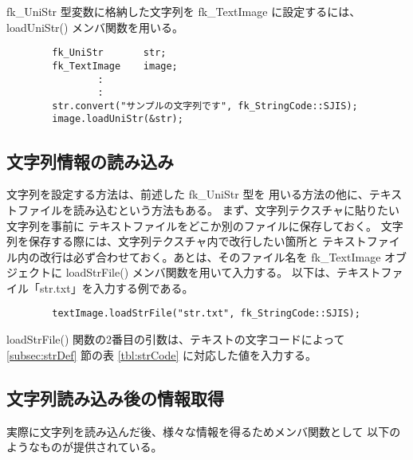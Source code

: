 fk\_UniStr 型変数に格納した文字列を
fk\_TextImage に設定するには、loadUniStr() メンバ関数を用いる。
\\
\begin{screen}
\begin{verbatim}
        fk_UniStr       str;
        fk_TextImage    image;
                :
                :
        str.convert("サンプルの文字列です", fk_StringCode::SJIS);
        image.loadUniStr(&str);
\end{verbatim}
\end{screen}
\subsection{文字列情報の読み込み}
文字列を設定する方法は、前述した fk\_UniStr 型を
用いる方法の他に、テキストファイルを読み込むという方法もある。
まず、文字列テクスチャに貼りたい文字列を事前に
テキストファイルをどこか別のファイルに保存しておく。
文字列を保存する際には、文字列テクスチャ内で改行したい箇所と
テキストファイル内の改行は必ず合わせておく。あとは、そのファイル名を
fk\_TextImage オブジェクトに loadStrFile() メンバ関数を用いて入力する。
以下は、テキストファイル「str.txt」を入力する例である。
\\
\begin{screen}
\begin{verbatim}
        textImage.loadStrFile("str.txt", fk_StringCode::SJIS);
\end{verbatim}
\end{screen}
loadStrFile() 関数の2番目の引数は、テキストの文字コードによって
\ref{subsec:strDef} 節の表 \ref{tbl:strCode} に対応した値を入力する。

\subsection{文字列読み込み後の情報取得}
実際に文字列を読み込んだ後、様々な情報を得るためメンバ関数として
以下のようなものが提供されている。

